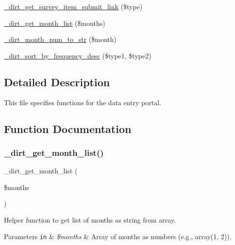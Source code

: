 \begin{DoxyCompactItemize}
\item 
\mbox{\hyperlink{dirt_8data__entry__portal_8inc_a690078604b6976b321c5e6aab0f9cc0f}{\+\_\+dirt\+\_\+get\+\_\+survey\+\_\+item\+\_\+submit\+\_\+link}} (\$type)
\item 
\mbox{\hyperlink{dirt_8data__entry__portal_8inc_a499a6ca05bc3c7aac513cdc6c9c7bad6}{\+\_\+dirt\+\_\+get\+\_\+month\+\_\+list}} (\$months)
\item 
\mbox{\hyperlink{dirt_8data__entry__portal_8inc_a51fb9f346c6a479ed800d2cf6f388ed9}{\+\_\+dirt\+\_\+month\+\_\+num\+\_\+to\+\_\+str}} (\$month)
\item 
\mbox{\hyperlink{dirt_8data__entry__portal_8inc_a3f24c33d83804c792a622cb0073873e5}{\+\_\+dirt\+\_\+sort\+\_\+by\+\_\+frequency\+\_\+desc}} (\$type1, \$type2)
\end{DoxyCompactItemize}


\subsection{Detailed Description}
This file specifies functions for the data entry portal. 

\subsection{Function Documentation}
\mbox{\label{dirt_8data__entry__portal_8inc_a499a6ca05bc3c7aac513cdc6c9c7bad6}} 
\subsubsection{\texorpdfstring{\+\_\+dirt\+\_\+get\+\_\+month\+\_\+list()}{\_dirt\_get\_month\_list()}}
{\footnotesize\ttfamily \+\_\+dirt\+\_\+get\+\_\+month\+\_\+list (\begin{DoxyParamCaption}\item[{}]{\$months }\end{DoxyParamCaption})}

Helper function to get list of months as string from array.


\begin{DoxyParams}[1]{Parameters}
\mbox{\tt in}  & {\em \$months} & Array of months as numbers (e.\+g., array(\textquotesingle{}1\textquotesingle{}, \textquotesingle{}2\textquotesingle{})).\\
\hline
\end{DoxyParams}

